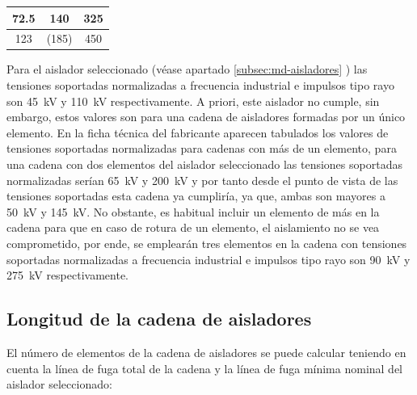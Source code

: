 \begin{table}[H]
\begin{tabular}{|c|c|c|}
72.5                                                                                                                  & 140                                                                                                                                                  & 325                                                                                                                                \\ \hline
123                                                                                                                   & (185)                                                                                                                                                 & 450                                                                                                                                \\ \hline
\end{tabular}
\end{table}

Para el aislador seleccionado (véase apartado \ref{subsec:md-aisladores} ) las tensiones soportadas normalizadas a frecuencia industrial e impulsos tipo rayo son \SI{45}{\kilo\volt} y \SI{110}{\kilo\volt} respectivamente. A priori, este aislador no cumple, sin embargo, estos valores son para una cadena de aisladores formadas por un único elemento. En la ficha técnica del fabricante aparecen tabulados los valores de tensiones soportadas normalizadas para cadenas con más de un elemento, para una cadena con dos elementos del aislador seleccionado las tensiones soportadas normalizadas serían \SI{65}{\kilo\volt} y \SI{200}{\kilo\volt} y por tanto desde el punto de vista de las tensiones soportadas esta cadena ya cumpliría, ya que, ambas son mayores a \SI{50}{\kilo\volt} y \SI{145}{\kilo\volt}. No obstante, es habitual incluir un elemento de más en la cadena para que en caso de rotura de un elemento, el aislamiento no se vea comprometido, por ende, se emplearán tres elementos en la cadena con tensiones soportadas normalizadas a frecuencia industrial e impulsos tipo rayo son \SI{90}{\kilo\volt} y \SI{275}{\kilo\volt} respectivamente.

\subsection{Longitud de la cadena de aisladores}
\label{subsec:aisl-longitudCadena}
El número de elementos de la cadena de aisladores se puede calcular teniendo en cuenta la línea de fuga total de la cadena y la línea de fuga mínima nominal del aislador seleccionado:

